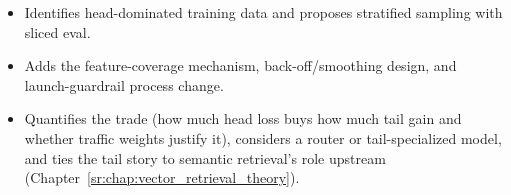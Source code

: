 \begin{interviewq}

\goodgreat
\begin{itemize}
    \item {} Identifies head-dominated training data and proposes stratified sampling with sliced eval.
    \item {} Adds the feature-coverage mechanism, back-off/smoothing design, and launch-guardrail process change.
    \item {} Quantifies the trade (how much head loss buys how much tail gain and whether traffic weights justify it), considers a router or tail-specialized model, and ties the tail story to semantic retrieval's role upstream (Chapter~\ref{sr:chap:vector_retrieval_theory}).
\end{itemize}

\end{interviewq}

